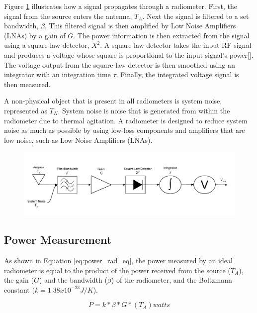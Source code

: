 Figure \ref{trad_radiometer} illustrates how a signal propagates through a radiometer.  First, the signal from the source enters the antenna, $T_A$.  Next the signal is filtered to a set bandwidth, $\beta$.  This filtered signal is then amplified by Low Noise Amplifiers (LNAs) by a gain of $G$.  The power information is then extracted from the signal using a square-law detector, $X^2$.  A square-law detector takes the input RF signal and produces a voltage whose square is proportional to the input signal's power[\cite{Leinweber}].  The voltage output from the square-law detector is then smoothed using an integrator with an integration time $\tau$.  Finally, the integrated voltage signal is then measured.

A non-physical object that is present in all radiometers is system noise, represented as $T_{N}$.  System noise is noise that is generated from within the radiometer due to thermal agitation.  A radiometer is designed to reduce system noise as much as possible by using low-loss components and amplifiers that are low noise, such as Low Noise Amplifiers (LNAs). 

{\begin{figure}[h!tb] 
\centering
\includegraphics[width=\textwidth]{Images/Traditional_Radiometer.pdf}
\label{trad_radiometer}
\end{figure}
}

\subsection{Power Measurement}\label{pwr_measurement}

As shown in Equation \ref{eq:power_rad_eq}, the power measured by an ideal radiometer is equal to the product of the power received from the source ($T_A$), the gain ($G$) and the bandwidth ($\beta$) of the radiometer, and the Boltzmann constant ($k=1.38 x 10^{-23} J/K$).

\begin{equation} \label{eq:power_rad_eq}
P=k*\beta*G*(T_{A}) watts
\end{equation}

